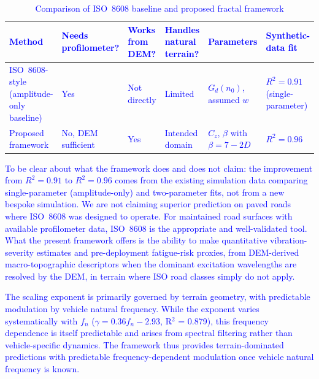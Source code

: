 \documentclass[11pt]{article}
\begin{document}
\textcolor{blue}{\begin{table}[h]
\centering
\caption{Comparison of ISO~8608 baseline and proposed fractal framework}
\label{tab:iso_comparison}
\small
\begin{tabular}{p{3.2cm}p{2.2cm}p{2.2cm}p{2.4cm}p{2.2cm}p{2.0cm}}
\hline
\textbf{Method} & \textbf{Needs profilometer?} & \textbf{Works from DEM?} & \textbf{Handles natural terrain?} & \textbf{Parameters} & \textbf{Synthetic-data fit} \\
\hline
ISO~8608-style (amplitude-only baseline) & Yes & Not directly & Limited & $G_d(n_0)$, assumed $w$ & $R^2 = 0.91$ (single-parameter) \\
\hline
Proposed framework & No, DEM sufficient & Yes & Intended domain & $C_z$, $\beta$ with $\beta = 7{-}2D$ & $R^2 = 0.96$ \\
\hline
\end{tabular}
\end{table}}

\textcolor{blue}{To be clear about what the framework does and does not claim: the improvement from $R^2 = 0.91$ to $R^2 = 0.96$ comes from the existing simulation data comparing single-parameter (amplitude-only) and two-parameter fits, not from a new bespoke simulation. We are not claiming superior prediction on paved roads where ISO~8608 was designed to operate. For maintained road surfaces with available profilometer data, ISO~8608 is the appropriate and well-validated tool. What the present framework offers is the ability to make quantitative vibration-severity estimates and pre-deployment fatigue-risk proxies, from DEM-derived macro-topographic descriptors when the dominant excitation wavelengths are resolved by the DEM, in terrain where ISO road classes simply do not apply.}

\textcolor{blue}{The scaling exponent is primarily governed by terrain geometry, with predictable modulation by vehicle natural frequency. While the exponent varies systematically with $f_n$ ($\gamma = 0.36 f_n - 2.93$, R$^2$ = 0.879), this frequency dependence is itself predictable and arises from spectral filtering rather than vehicle-specific dynamics. The framework thus provides terrain-dominated predictions with predictable frequency-dependent modulation once vehicle natural frequency is known.}
\end{document}
